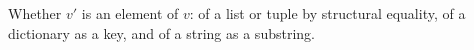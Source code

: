 Whether $v'$ is an element of $v$: of a list or tuple by structural equality, of a dictionary as a key,
and of a string as a substring.
